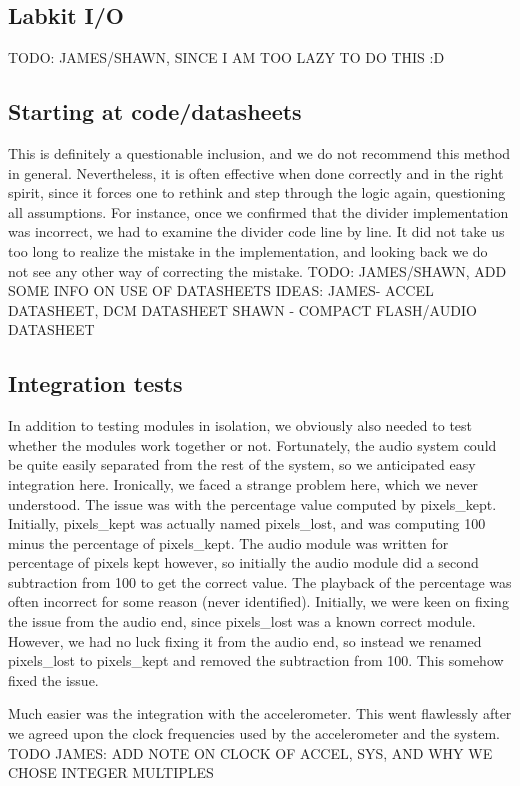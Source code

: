 \documentclass{article}
\begin{document}
\subsection{Labkit I/O}
TODO: JAMES/SHAWN, SINCE I AM TOO LAZY TO DO THIS :D

\subsection{Starting at code/datasheets}
This is definitely a questionable inclusion, and we do not recommend this method in general.
Nevertheless, it is often effective when done correctly and in the right spirit,
since it forces one to rethink and step through the logic again, questioning all assumptions.
For instance, once we confirmed that the divider implementation was incorrect,
we had to examine the divider code line by line.
It did not take us too long to realize the mistake in the implementation,
and looking back we do not see any other way of correcting the mistake.
TODO: JAMES/SHAWN, ADD SOME INFO ON USE OF DATASHEETS
IDEAS: JAMES- ACCEL DATASHEET, DCM DATASHEET
SHAWN - COMPACT FLASH/AUDIO DATASHEET

\subsection{Integration tests}
In addition to testing modules in isolation, we obviously also needed to test whether the modules work together or not.
Fortunately, the audio system could be quite easily separated from the rest of the system, so we anticipated easy integration here.
Ironically, we faced a strange problem here, which we never understood.
The issue was with the percentage value computed by pixels\_kept.
Initially, pixels\_kept was actually named pixels\_lost, and was computing 100 minus the percentage of pixels\_kept.
The audio module was written for percentage of pixels kept however,
so initially the audio module did a second subtraction from 100 to get the correct value.
The playback of the percentage was often incorrect for some reason (never identified).
Initially, we were keen on fixing the issue from the audio end, since pixels\_lost was a known correct module.
However, we had no luck fixing it from the audio end, so instead we renamed pixels\_lost to pixels\_kept and removed the subtraction from 100.
This somehow fixed the issue.

Much easier was the integration with the accelerometer.
This went flawlessly after we agreed upon the clock frequencies used by the accelerometer and the system.
TODO JAMES: ADD NOTE ON CLOCK OF ACCEL, SYS, AND WHY WE CHOSE INTEGER MULTIPLES
\end{document}

